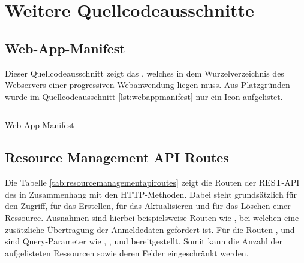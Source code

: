 \chapter{Weitere Quellcodeausschnitte}
\label{chap:weiterequellcodeausschnitte}

\section*{Web-App-Manifest}
\label{sec:webappmanifest}
Dieser Quellcodeausschnitt zeigt das , welches in dem Wurzelverzeichnis
des Webservers einer progressiven Webanwendung liegen muss. Aus Platzgründen wurde im Quellcodeausschnitt
\ref{lst:webappmanifest} nur ein Icon aufgelistet.

\begin{listing}[h]
    \inputminted{jsx}{snippets/json/manifest.json}
    \caption{Web-App-Manifest}
    \label{lst:webappmanifest}
\end{listing}

\newpage

\section*{Resource Management API Routes}
\label{sec:resourcemanagementapiroutes}
Die Tabelle \ref{tab:resourcemanagementapiroutes} zeigt die
Routen der REST-API des  in Zusammenhang
mit den HTTP-Methoden. Dabei steht grundsätzlich  für den Zugriff,
 für das Erstellen,  für das Aktualisieren und 
für das Löschen einer Ressource. Ausnahmen sind hierbei beispielsweise Routen wie
, bei welchen eine zusätzliche Übertragung der Anmeldedaten
gefordert ist. Für die Routen ,  und 
sind Query-Parameter wie , ,  und
 bereitgestellt. Somit kann die Anzahl der aufgelisteten Ressourcen
sowie deren Felder eingeschränkt werden.

